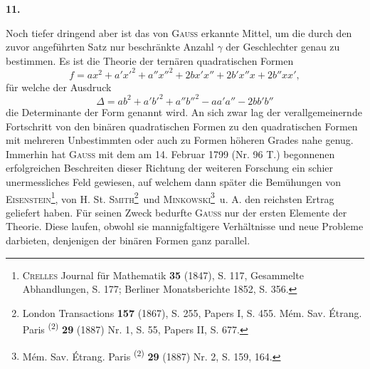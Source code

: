 \begin{center}\end{center}
\begin{center}\bfseries 11.\end{center}
\noindent\hspace*{\parindent}Noch tiefer dringend aber ist das von \textsc{Gauss} erkannte Mittel, um die durch den zuvor angeführten Satz nur beschränkte Anzahl \(\gamma\) der Geschlechter genau zu bestimmen. Es ist die Theorie der ternären quadratischen Formen
\[
f=ax^2+a'x'^2+a''x''^2+2bx'x''+2b'x''x+2b''xx',
\]
für welche der Ausdruck
\[
\Delta=ab^2+a'b'^2+a''b''^2-aa'a''-2bb'b''
\]
die Determinante der Form genannt wird. An sich zwar lag der verallgemeinernde Fortschritt von den binären quadratischen Formen zu den quadratischen Formen mit mehreren Unbestimmten oder auch zu Formen höheren Grades nahe genug. Immerhin hat \textsc{Gauss} mit dem am 14. Februar 1799 (Nr. 96 T.) begonnenen erfolgreichen Beschreiten dieser Richtung der weiteren Forschung ein schier unermessliches Feld gewiesen, auf welchem dann später die Bemühungen von \textsc{Eisenstein}\footnote{\textsc{Crelles} Journal für Mathematik \textbf{35} (1847), S. 117, Gesammelte Abhandlungen, S. 177; Berliner Monatsberichte 1852, S. 356.}, von H. St. \textsc{Smith}\begingroup\renewcommand{\thefootnote}{**)}\footnote{London Transactions \textbf{157} (1867), S. 255, Papers I, S. 455. Mém. Sav. Étrang. Paris \textsuperscript{(2)} \textbf{29} (1887) Nr. 1, S. 55, Papers II, S. 677.}\endgroup\ und \textsc{Minkowski}\begingroup\renewcommand{\thefootnote}{***)}\footnote{Mém. Sav. Étrang. Paris \textsuperscript{(2)} \textbf{29} (1887) Nr. 2, S. 159, 164.}\endgroup\ u. A. den reichsten Ertrag geliefert haben. Für seinen Zweck bedurfte \textsc{Gauss} nur der ersten Elemente der Theorie. Diese laufen, obwohl sie mannigfaltigere
\newpage{}
\noindent Verhältnisse und neue Probleme darbieten, denjenigen der binären Formen ganz parallel.

